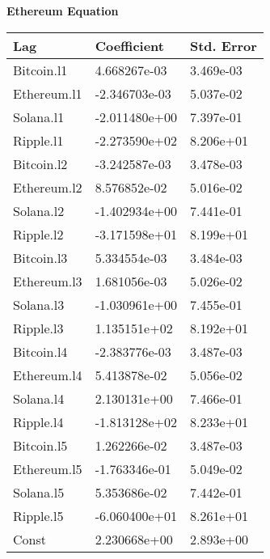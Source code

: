 \begin{table}[ht]
\begin{multicols}{2}
\textbf{Ethereum Equation}
\begin{tabular}{|l|l|l|}
\hline
\textbf{Lag} & \textbf{Coefficient} & \textbf{Std. Error} \\
\hline
Bitcoin.l1     & 4.668267e-03 & 3.469e-03 \\
Ethereum.l1    & -2.346703e-03 & 5.037e-02 \\
Solana.l1      & -2.011480e+00 & 7.397e-01 \\
Ripple.l1      & -2.273590e+02 & 8.206e+01 \\
\hline
Bitcoin.l2     & -3.242587e-03 & 3.478e-03 \\
Ethereum.l2    & 8.576852e-02 & 5.016e-02 \\
Solana.l2      & -1.402934e+00 & 7.441e-01 \\
Ripple.l2      & -3.171598e+01 & 8.199e+01 \\
\hline
Bitcoin.l3     & 5.334554e-03 & 3.484e-03 \\
Ethereum.l3    & 1.681056e-03 & 5.026e-02 \\
Solana.l3      & -1.030961e+00 & 7.455e-01 \\
Ripple.l3      & 1.135151e+02 & 8.192e+01 \\
\hline
Bitcoin.l4     & -2.383776e-03 & 3.487e-03 \\
Ethereum.l4    & 5.413878e-02 & 5.056e-02 \\
Solana.l4      & 2.130131e+00 & 7.466e-01 \\
Ripple.l4      & -1.813128e+02 & 8.233e+01 \\
\hline
Bitcoin.l5     & 1.262266e-02 & 3.487e-03 \\
Ethereum.l5    & -1.763346e-01 & 5.049e-02 \\
Solana.l5      & 5.353686e-02 & 7.442e-01 \\
Ripple.l5      & -6.060400e+01 & 8.261e+01 \\
\hline
Const          & 2.230668e+00 & 2.893e+00 \\
\hline
\end{tabular}
\end{multicols}
\end{table}

